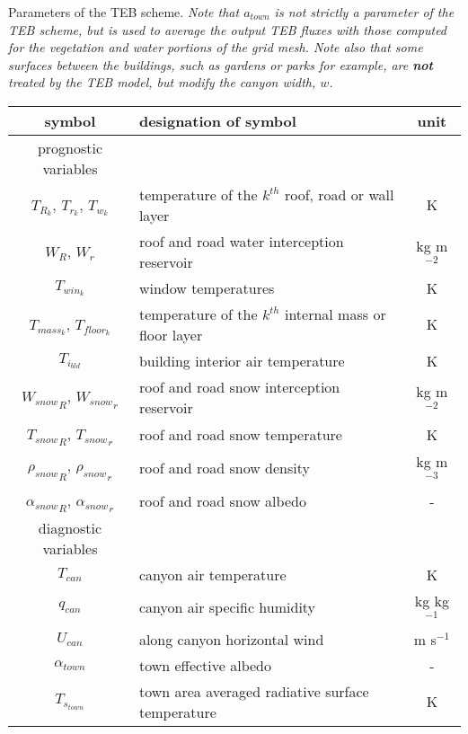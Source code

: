 \begin{table}
\caption{Parameters of the TEB scheme.  {\it{ Note that $a_{town}$ is not strictly
a parameter of the TEB scheme, but is used to average the output TEB fluxes
with those computed for the vegetation and water portions of the
grid mesh.
Note also that some surfaces
between the buildings, such as gardens or parks for example, are {\bf not}
treated by the TEB model, but modify the canyon width, $w$.}}
}
\label{symbol}
\end{table}


\clearpage

\begin{table}

{\footnotesize{
\begin{tabular}{c l c}
\hline
symbol                             & designation of symbol & unit    \\
\hline 
prognostic variables && \\
\hline
$T_{R_k}$, $T_{r_k}$, $T_{w_k}$  & temperature of the $k^{th}$ roof, road or wall layer & K \\
$W_R$, $W_r$              & roof and road water interception reservoir& kg m$^{-2}$ \\
$T_{win_k}$  & window temperatures & K \\
$T_{mass_k}$, $T_{floor_k}$  & temperature of the $k^{th}$ internal mass or floor layer & K \\
$T_{i_{bld}}$  & building interior air temperature & K \\
${W_{snow}}_R$, ${W_{snow}}_r$ & roof and road snow interception reservoir& kg m$^{-2}$ \\
${T_{snow}}_R$, ${T_{snow}}_r$ & roof and road snow temperature& K \\
${\rho_{snow}}_R$, ${\rho_{snow}}_r$ & roof and road snow density& kg m$^{-3}$ \\
${\alpha_{snow}}_R$, ${\alpha_{snow}}_r$ & roof and road snow albedo& -  \\
\hline
diagnostic variables && \\
\hline
$T_{can}$ & canyon air temperature & K \\
$q_{can}$ & canyon air specific humidity & kg kg$^{-1}$ \\
$U_{can}$ & along canyon horizontal wind & m s$^{-1}$ \\
$\alpha_{town}$ & town effective albedo& - \\
$T_{s_{town}}$ & town area averaged radiative surface temperature & K \\

\end{tabular}}}
\end{table}

